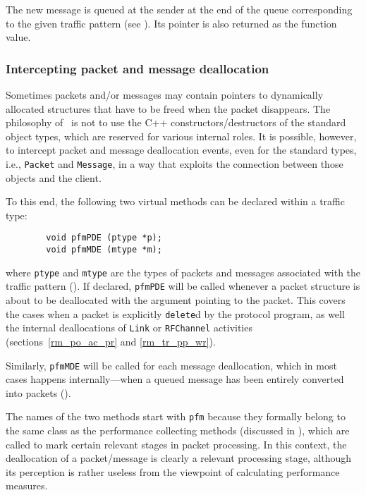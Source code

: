 The new message is queued at the sender at the end of
the queue corresponding to the given traffic pattern (see ).
Its pointer is also returned as the function value.

\subsubsection{Intercepting packet and message deallocation}
\label{rm_cl_dt_de}

Sometimes packets and/or messages may contain pointers to dynamically allocated
structures that have to be freed when the packet disappears.
The philosophy of \smurph\ is not to use the C++ constructors/destructors
of the standard object types, which are reserved for various internal roles.
It is possible, however, to intercept packet and message deallocation events,
even for the standard types, i.e., {\tt Packet} and {\tt Message}, in a way
that exploits the connection between those objects and the client.

To this end,
the following two virtual methods can be declared within a traffic type:

\begin{verbatim}
        void pfmPDE (ptype *p);
        void pfmMDE (mtype *m);
\end{verbatim}
\noindent
where {\tt ptype} and {\tt mtype} are the types of packets and messages
associated with the traffic pattern ().
If declared, {\tt pfmPDE} will be called whenever a packet structure is
about to be deallocated with the argument pointing to the packet.
This covers the cases when a packet is explicitly {\tt delete}d by the
protocol program, as well the internal deallocations of {\tt Link} or
{\tt RFChannel} activities (sections~\ref{rm_po_ac_pr} and \ref{rm_tr_pp_wr}).

Similarly, {\tt pfmMDE} will be called for each message deallocation, which
in most cases happens internally---when a queued message has been entirely 
converted into packets ().

The names of the two methods start with {\tt pfm} because they formally
belong to the same class as the performance collecting methods (discussed
in ), which are called to mark certain relevant stages in
packet processing.
In this context, the deallocation of a packet/message is clearly a relevant
processing stage, although its perception is rather useless from the
viewpoint of calculating performance measures.

